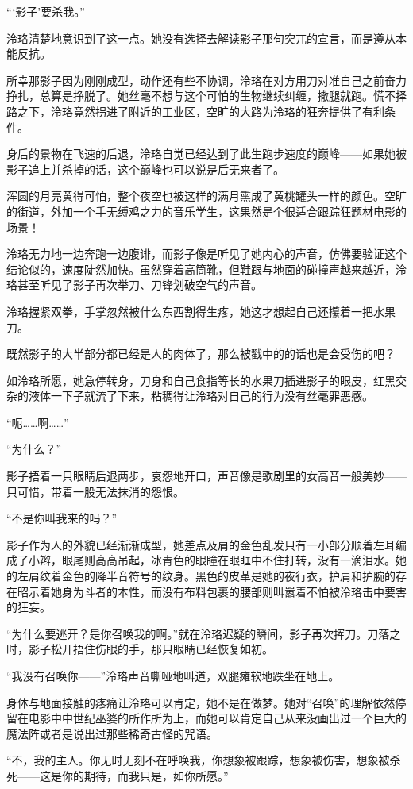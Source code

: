 \documentclass[UTF8, scheme = chinese, openany]{ctexbook}
\begin{document}
“‘影子’要杀我。”

泠珞清楚地意识到了这一点。她没有选择去解读影子那句突兀的宣言，而是遵从本能反抗。

所幸那影子因为刚刚成型，动作还有些不协调，泠珞在对方用刀对准自己之前奋力挣扎，总算是挣脱了。她丝毫不想与这个可怕的生物继续纠缠，撒腿就跑。慌不择路之下，泠珞竟然拐进了附近的工业区，空旷的大路为泠珞的狂奔提供了有利条件。

身后的景物在飞速的后退，泠珞自觉已经达到了此生跑步速度的巅峰——如果她被影子追上并杀掉的话，这个巅峰也可以说是后无来者了。

浑圆的月亮黄得可怕，整个夜空也被这样的满月熏成了黄桃罐头一样的颜色。空旷的街道，外加一个手无缚鸡之力的音乐学生，这果然是个很适合跟踪狂题材电影的场景！

泠珞无力地一边奔跑一边腹诽，而影子像是听见了她内心的声音，仿佛要验证这个结论似的，速度陡然加快。虽然穿着高筒靴，但鞋跟与地面的碰撞声越来越近，泠珞甚至听见了影子再次举刀、刀锋划破空气的声音。

泠珞握紧双拳，手掌忽然被什么东西割得生疼，她这才想起自己还攥着一把水果刀。

既然影子的大半部分都已经是人的肉体了，那么被戳中的的话也是会受伤的吧？

如泠珞所愿，她急停转身，刀身和自己食指等长的水果刀插进影子的眼皮，红黑交杂的液体一下子就流了下来，粘稠得让泠珞对自己的行为没有丝毫罪恶感。

“呃……啊……”

“为什么？”

影子捂着一只眼睛后退两步，哀怨地开口，声音像是歌剧里的女高音一般美妙——只可惜，带着一股无法抹消的怨恨。

“不是你叫我来的吗？”

影子作为人的外貌已经渐渐成型，她差点及肩的金色乱发只有一小部分顺着左耳编成了小辫，眼尾则高高吊起，冰青色的眼瞳在眼眶中不住打转，没有一滴泪水。她的左肩纹着金色的降半音符号的纹身。黑色的皮革是她的夜行衣，护肩和护腕的存在昭示着她身为斗者的本性，而没有布料包裹的腰部则叫嚣着不怕被泠珞击中要害的狂妄。

“为什么要逃开？是你召唤我的啊。”就在泠珞迟疑的瞬间，影子再次挥刀。刀落之时，影子松开捂住伤眼的手，那只眼睛已经恢复如初。

“我没有召唤你——”泠珞声音嘶哑地叫道，双腿瘫软地跌坐在地上。

身体与地面接触的疼痛让泠珞可以肯定，她不是在做梦。她对“召唤”的理解依然停留在电影中中世纪巫婆的所作所为上，而她可以肯定自己从来没画出过一个巨大的魔法阵或者是说出过那些稀奇古怪的咒语。

“不，我的主人。你无时无刻不在呼唤我，你想象被跟踪，想象被伤害，想象被杀死——这是你的期待，而我只是，如你所愿。”
\end{document}

